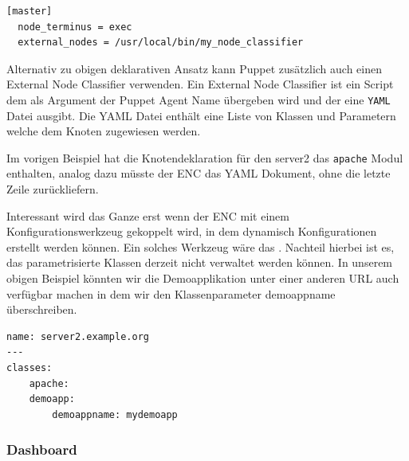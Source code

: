 \documentclass[12pt,a4paper,ngerman]{article}
\begin{document}
\begin{lstlisting}[caption=External Node Classifier Konfiguration des Puppet Master, label=puppet-enc-config]
[master]
  node_terminus = exec
  external_nodes = /usr/local/bin/my_node_classifier
\end{lstlisting} 

Alternativ zu obigen deklarativen Ansatz kann Puppet zusätzlich auch einen External Node Classifier verwenden.  Ein External Node Classifier ist ein Script dem als Argument der Puppet Agent Name übergeben wird und der eine \lstinline$YAML$ Datei ausgibt. Die YAML Datei enthält eine Liste von Klassen und Parametern welche dem Knoten zugewiesen werden.  

Im vorigen Beispiel hat die Knotendeklaration für den server2 das \lstinline$apache$ Modul enthalten, analog dazu müsste der ENC das YAML Dokument, ohne die letzte Zeile zurückliefern.  

Interessant wird das Ganze erst wenn der ENC mit einem Konfigurationswerkzeug gekoppelt wird, in dem dynamisch Konfigurationen erstellt werden können. Ein solches Werkzeug wäre das \cite{puppetdashboard}. Nachteil hierbei ist es, das parametrisierte Klassen derzeit nicht verwaltet werden können. In unserem obigen Beispiel könnten wir die Demoapplikation unter einer anderen URL auch verfügbar machen in dem wir den Klassenparameter demoappname überschreiben.


\begin{lstlisting}[caption=ENC's YAML mit Klassenparameter , label=puppet-enc-yaml-param]
name: server2.example.org
---
classes: 
    apache:
    demoapp: 
        demoappname: mydemoapp
\end{lstlisting} 

\subsubsection{Dashboard}
\end{document}
